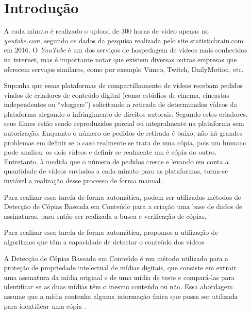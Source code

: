 \chapter{Introdução}
\label{chap:introducao}

A cada minuto é realizado o upload de 300 horas de vídeo apenas no \textit{youtube.com}, segundo os dados da pesquisa realizada pelo site statisticbrain.com em 2016. O \textit{YouTube} é um dos serviços de hospedagem de vídeos mais conhecidos na internet, mas é importante notar que existem diversas outras empresas que oferecem serviços similares, como por exemplo Vimeo, Twitch, DailyMotion, etc.

Suponha que essas plataformas de compartilhamento de vídeos recebam pedidos vindos de criadores de conteúdo digital (como estúdios de cinema, cineastas independentes ou ``vloggers'') solicitando a retirada de determinados vídeos da plataforma alegando o infringimento de direitos autorais. Segundo estes criadores, seus filmes estão sendo reproduzidos parcial ou integralmente na plataforma sem autorização. Enquanto o número de pedidos de retirada é baixo, não há grandes problemas em definir se o caso realmente se trata de uma cópia, pois um humano pode analisar os dois vídeos e definir se realmente um é cópia do outro. Entretanto, à medida que o número de pedidos cresce e levando em conta a quantidade de vídeos enviados a cada minuto para as plataformas, torna-se  inviável a realização desse processo de forma manual. 

Para realizar essa tarefa de forma automática, podem ser utilizados métodos de Detecção de Cópias Baseada em Conteúdo para a criação uma base de dados de assinaturas, para então ser realizada a busca e verificação de cópias.

Para realizar essa tarefa de forma automática, propomos a utilização de algoritmos que têm a capacidade de detectar o conteúdo dos vídeos

A Detecção de Cópias Baseada em Conteúdo é um método utilizado para a proteção de propriedade intelectual de mídias digitais, que consiste em extrair uma assinatura da mídia original e de uma mídia de teste e compará-las para identificar se as duas mídias têm o mesmo conteúdo ou não. Essa abordagem assume que a mídia contenha alguma informação única que possa ser utilizada para identificar uma cópia \citeauthor{kim2005spatiotemporal}. 




